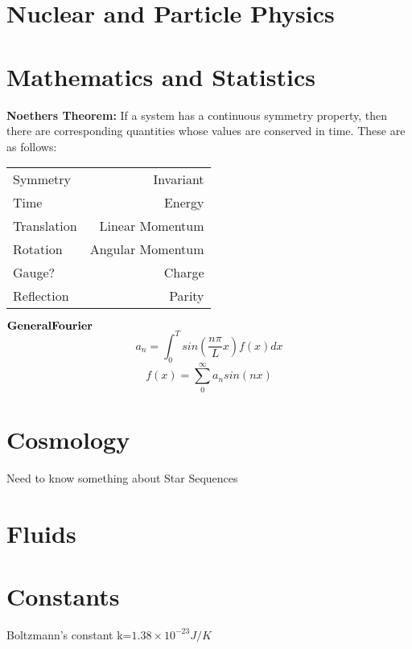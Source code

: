 \documentclass{article}
\begin{document}
\section{Nuclear and Particle Physics}









\section{Mathematics and Statistics}
{\bf Noethers Theorem:} If a system has a continuous symmetry property, then there are corresponding quantities whose values are conserved in time.  These are as follows:

\begin{tabular}{ l | r}
  Symmetry & Invariant\\
  Time & Energy\\
  Translation & Linear Momentum\\
  Rotation & Angular Momentum\\
  Gauge? & Charge\\
  Reflection & Parity\\
\end{tabular}

${\bf General Fourier}$ \begin{equation}a_n=\int_0^T sin(\frac{n\pi}{L}x)f(x)dx\end{equation}
\begin{equation}f(x)=\sum_0^{\infty} a_n sin(n x)\end{equation}




\section{Cosmology}
Need to know something about Star Sequences








\section{Fluids}









\section{Constants}
Boltzmann's constant k=$1.38\times10^{-23} J/K$
\end{document}
